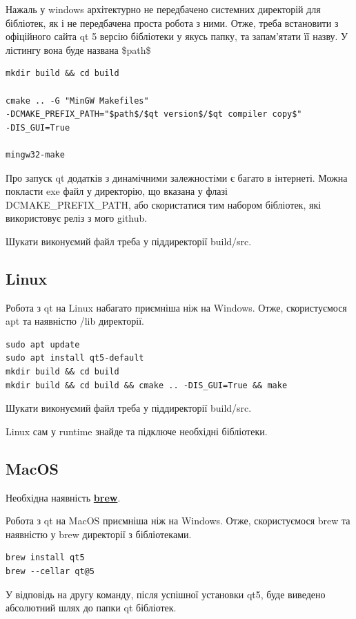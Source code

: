 \documentclass[oneside,final,14pt]{extreport}
\begin{document}
Нажаль у windows архітектурно не передбачено системних директорій для бібліотек, як і не передбачена проста робота з ними. Отже, треба встановити з офіційного сайта qt 5 версію бібліотеки у якусь папку, та запам'ятати її назву. У лістингу вона буде названа \$path\$
\begin{tcolorbox}
\begin{verbatim}
mkdir build && cd build

cmake .. -G "MinGW Makefiles"
-DCMAKE_PREFIX_PATH="$path$/$qt version$/$qt compiler copy$" 
-DIS_GUI=True

mingw32-make
\end{verbatim}
\end{tcolorbox}

Про запуск qt додатків з динамічними залежностіми є багато в інтернеті. Можна покласти exe файл у директорію, що вказана у флазі DCMAKE\_PREFIX\_PATH, або скористатися тим набором бібліотек, які використовує реліз з мого github.

Шукати виконуємий файл треба у піддиректорії build/src.

\subsection{Linux}

Робота з qt на Linux набагато приємніша ніж на Windows. Отже, скористуємося apt та наявністю /lib директорії.

\begin{tcolorbox}
\begin{verbatim}
sudo apt update
sudo apt install qt5-default
mkdir build && cd build
mkdir build && cd build && cmake .. -DIS_GUI=True && make
\end{verbatim}
\end{tcolorbox}

Шукати виконуємий файл треба у піддиректорії build/src.

Linux сам у runtime знайде та підключе необхідні бібліотеки.

\subsection{MacOS}

Необхідна наявність \textbf{\href{https://brew.sh}{brew}}.

Робота з qt на MacOS приємніша ніж на Windows. Отже, скористуємося brew та наявністю у brew директорії з бібліотеками.

\begin{tcolorbox}
\begin{verbatim}
brew install qt5
brew --cellar qt@5
\end{verbatim}
\end{tcolorbox}
У відповідь на другу команду, після успішної установки qt5, буде виведено абсолютний шлях до папки qt бібліотек.
\end{document}
